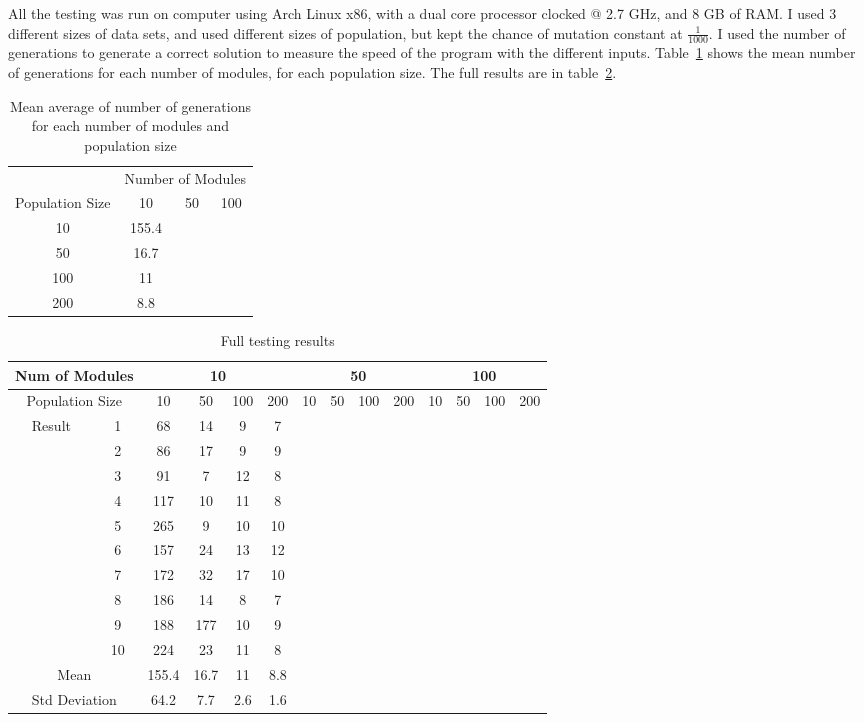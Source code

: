 All the testing was run on computer using Arch Linux x86, with 
a dual core processor clocked @ 2.7 GHz, and 8 GB of RAM.
I used 3 different sizes of data sets, and used different sizes of population, 
but kept the chance of mutation constant at \( \frac{1}{1000} \).
I used the number of generations to generate a correct solution to measure the
speed of the program with the different inputs.
Table~\ref*{table:results-mean} shows the mean number of generations for each
number of modules, for each population size.
The full results are in table~\ref*{table:results-full}.

\begin{table}
	\begin{tabular}{c|ccc}
		\toprule
		& \multicolumn{3}{c}{Number of Modules} \\
		Population Size & 10 & 50 & 100 \\
		\midrule
		10 & 155.4 \\
		50 & 16.7 \\
		100 & 11 \\
		200 & 8.8 \\
		\bottomrule
	\end{tabular}
	\caption{Mean average of number of generations for each number of modules
		and population size}
	\label{table:results-mean}
\end{table}

\begin{table}
	\begin{tabular}{cc|cccc|cccc|cccc}
		\toprule
		\multicolumn{2}{c}{Num of Modules}
			& \multicolumn{4}{c}{10}
			& \multicolumn{4}{c}{50}
			& \multicolumn{4}{c}{100} \\
		\midrule
		\multicolumn{2}{c}{Population Size}
			& 10 & 50 & 100 & 200 
			& 10 & 50 & 100 & 200 
			& 10 & 50 & 100 & 200 \\
		\midrule
		Result & 1
			& 68 & 14 & 9 & 7
		\\
		& 2
			& 86 & 17 & 9 & 9
		\\
		& 3
			& 91 & 7 & 12 & 8
		\\
		& 4
			& 117 & 10 & 11 & 8
		\\
		& 5
			& 265 & 9 & 10 & 10
		\\
		& 6
			& 157 & 24 & 13 & 12
		\\
		& 7
			& 172 & 32 & 17 & 10
		\\
		& 8
			& 186 & 14 & 8 & 7
		\\
		& 9
			& 188 & 177 & 10 & 9
		\\
		& 10
			& 224 & 23 & 11 & 8
		\\
		\midrule
		\multicolumn{2}{c}{Mean}
			& 155.4 & 16.7 & 11 & 8.8
		\\
		\multicolumn{2}{c}{Std Deviation}
			& 64.2 & 7.7 & 2.6 & 1.6
		\\
		\bottomrule
	\end{tabular}
	\caption{Full testing results}
	\label{table:results-full}
\end{table}


